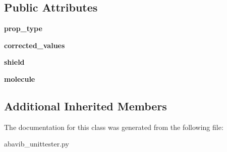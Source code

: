 \subsection*{Public Attributes}
\begin{DoxyCompactItemize}
\item 
\hypertarget{classabavib__unittester_1_1shield__test_a285f92b82f7a149c484452e55fcea707}{{\bfseries prop\+\_\+type}}\label{classabavib__unittester_1_1shield__test_a285f92b82f7a149c484452e55fcea707}

\item 
\hypertarget{classabavib__unittester_1_1shield__test_a177a0753de121fd13b7b68e59526a70b}{{\bfseries corrected\+\_\+values}}\label{classabavib__unittester_1_1shield__test_a177a0753de121fd13b7b68e59526a70b}

\item 
\hypertarget{classabavib__unittester_1_1shield__test_afa8a05a4a30dfff0a7b6af258a160142}{{\bfseries shield}}\label{classabavib__unittester_1_1shield__test_afa8a05a4a30dfff0a7b6af258a160142}

\item 
\hypertarget{classabavib__unittester_1_1shield__test_aebee7b74c39b728c5516961c2bf6b3d6}{{\bfseries molecule}}\label{classabavib__unittester_1_1shield__test_aebee7b74c39b728c5516961c2bf6b3d6}

\end{DoxyCompactItemize}
\subsection*{Additional Inherited Members}


The documentation for this class was generated from the following file\+:\begin{DoxyCompactItemize}
\item 
abavib\+\_\+unittester.\+py\end{DoxyCompactItemize}
